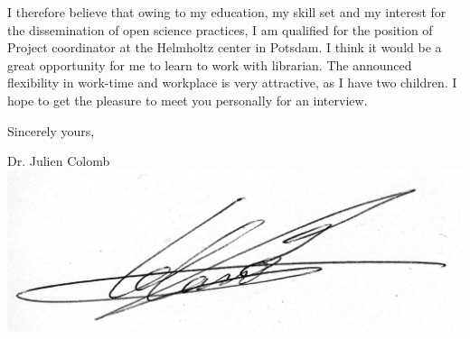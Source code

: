 I therefore believe that owing to my education, my skill set and my interest for the dissemination of open science practices, I am qualified for the position of Project coordinator at the Helmholtz center in Potsdam. I think it would be a great opportunity for me to learn to work with librarian. The announced flexibility in work-time and workplace is very attractive, as I have two children. I hope to get the pleasure to meet you personally for an interview.
 
Sincerely yours,\\

\hspace*{0.5\linewidth}
\begin{minipage}{0.3\linewidth}

Dr. Julien Colomb\\
\includegraphics[height=2\baselineskip]{Figures/signature.jpg}
\end{minipage}





